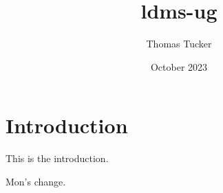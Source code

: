 \documentclass{article}
\title{ldms-ug}
\author{Thomas Tucker}
\date{October 2023}
\begin{document}
\maketitle

\section{Introduction}
This is the introduction.

Mon's change.
\end{document}
